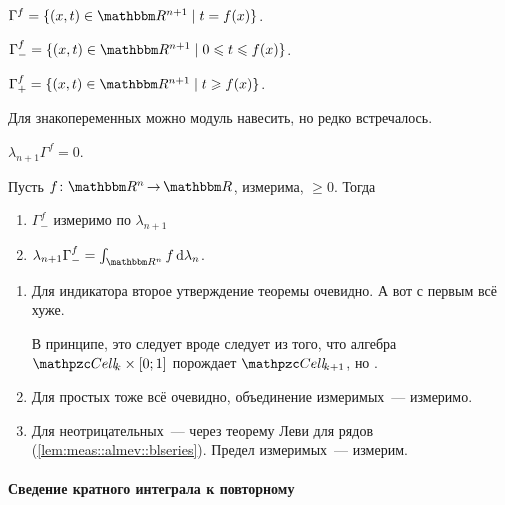 \documentclass[draft, timbord]{longnotes}
\begin{document}
\begin{defn}[График]\label{defn:meas::geomleb::plot}
  $\Gamma^f = \{ (x,t) \in \R^{n+1} \mid t = f(x)\}$.
\end{defn}
\begin{defn}[Подграфик]\label{defn:meas::geomleb::subplot}
  $\Gamma_-^f = \{ (x,t) \in \R^{n+1} \mid 0 \leqslant t \leqslant f(x)\}$.
\end{defn}
\begin{defn}[Надграфик]\label{defn:meas::geomleb::supplot}
  $\Gamma_+^f = \{ (x,t) \in \R^{n+1} \mid t \geqslant f(x)\}$.
\end{defn}
Для знакопеременных можно модуль навесить, но редко встречалось.

\begin{lem}\label{lem:meas::geomleb::plotmeas}
  $\lambda_{n+1} \Gamma^f = 0$.
\end{lem}
\begin{thrm}\label{thrm:meas::geomleb::geomsense}
  Пусть $f\colon \R^n \to \R$, измерима, $ \geqslant 0$. Тогда
  \begin{enumerate}
    \item $\Gamma_-^f$ измеримо по $\lambda_{n+1}$
    \item $\lambda_{n+1}\Gamma_-^f = \int_{\R^n} f\, \del \lambda_n$.
  \end{enumerate}
\end{thrm}
\begin{tproof}
  \begin{enumerate}
    \item Для индикатора второе утверждение теоремы очевидно. А вот с первым всё хуже.

      В принципе, это следует вроде следует из того, что алгебра 
      $\Cell_k \times [0;1]$ порождает $\Cell_{k+1}$, но \quest.

    \item Для простых тоже всё очевидно, объединение измеримых~--- измеримо.
    \item Для неотрицательных~--- через теорему Леви  для рядов (\ref{lem:meas::almev::blseries}).
      Предел измеримых~--- измерим.
  \end{enumerate}
\end{tproof}

\paragraph{Сведение кратного интеграла к повторному}
\label{par:meas::mult}
\end{document}
